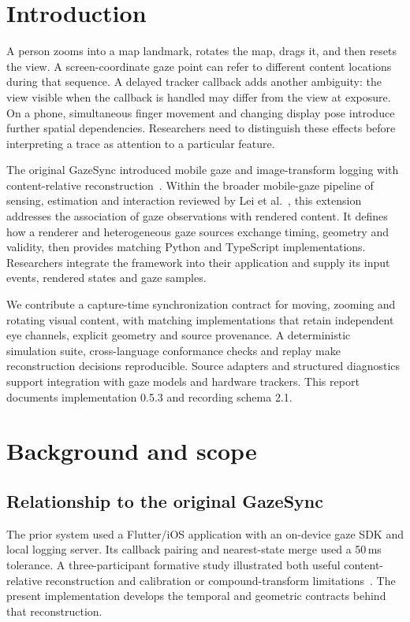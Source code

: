 \documentclass[sigconf,screen,nonacm]{acmart}
\begin{document}
\section{Introduction}
A person zooms into a map landmark, rotates the map, drags it, and then resets the view. A
screen-coordinate gaze point can refer to different content locations
during that sequence. A delayed tracker callback adds another ambiguity: the
view visible when the callback is handled may differ from the view at exposure.
On a phone, simultaneous finger movement and changing display pose introduce
further spatial dependencies. Researchers need to distinguish these effects
before interpreting a trace as attention to a particular feature.

The original GazeSync introduced mobile gaze and image-transform logging with
content-relative reconstruction~\cite{gazesync}. Within the broader mobile-gaze
pipeline of sensing, estimation and interaction reviewed by
Lei et al.~\cite{leisurvey}, this extension addresses the association of gaze
observations with rendered content. It defines how a renderer and heterogeneous
gaze sources exchange timing, geometry and validity, then provides matching
Python and TypeScript implementations. Researchers integrate the framework into
their application and supply its input events, rendered states and gaze samples.

We contribute a capture-time synchronization contract for moving, zooming and
rotating visual content, with matching implementations that retain independent
eye channels, explicit geometry and source provenance.
A deterministic simulation suite, cross-language conformance checks and replay
make reconstruction decisions reproducible. Source adapters and structured
diagnostics support integration with gaze models and hardware trackers.
This report documents implementation 0.5.3 and recording schema 2.1.

\section{Background and scope}
\subsection{Relationship to the original GazeSync}
The prior system used a Flutter/iOS application with an on-device gaze SDK and
local logging server. Its callback pairing and nearest-state merge used a
50\,ms tolerance. A three-participant formative study illustrated both useful
content-relative reconstruction and calibration or compound-transform
limitations~\cite{gazesync}. The present implementation develops the temporal
and geometric contracts behind that reconstruction.
\end{document}
